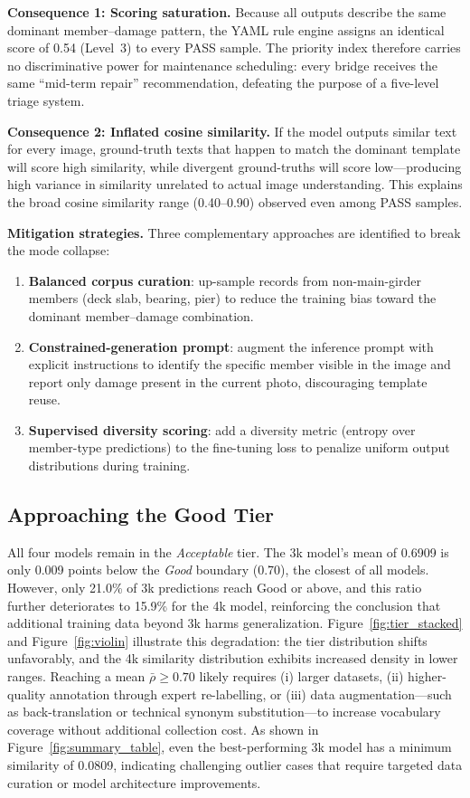 \documentclass[twocolumn]{article}
\begin{document}
\textbf{Consequence 1: Scoring saturation.}
Because all outputs describe the same dominant member--damage pattern,
the YAML rule engine assigns an identical score of 0.54 (Level~3)
to every PASS sample.
The priority index therefore carries no discriminative power for maintenance
scheduling: every bridge receives the same ``mid-term repair'' recommendation,
defeating the purpose of a five-level triage system.

\textbf{Consequence 2: Inflated cosine similarity.}
If the model outputs similar text for every image, ground-truth texts that
happen to match the dominant template will score high similarity, while
divergent ground-truths will score low---producing high variance in similarity
unrelated to actual image understanding.
This explains the broad cosine similarity range (0.40--0.90) observed
even among PASS samples.

\textbf{Mitigation strategies.}
Three complementary approaches are identified to break the mode collapse:
\begin{enumerate}[leftmargin=*,itemsep=2pt]
  \item \textbf{Balanced corpus curation}: up-sample records from non-main-girder
        members (deck slab, bearing, pier) to reduce the training bias toward
        the dominant member--damage combination.
  \item \textbf{Constrained-generation prompt}: augment the inference prompt
        with explicit instructions to identify the specific member visible in
        the image and report only damage present in the current photo,
        discouraging template reuse.
  \item \textbf{Supervised diversity scoring}: add a diversity metric
        (entropy over member-type predictions) to the fine-tuning loss
        to penalize uniform output distributions during training.
\end{enumerate}

\subsection{Approaching the Good Tier}

All four models remain in the \textit{Acceptable} tier.
The 3k model's mean of 0.6909 is only 0.009 points below the \textit{Good}
boundary (0.70), the closest of all models.
However, only 21.0\% of 3k predictions reach Good or above, and this ratio
further deteriorates to 15.9\% for the 4k model, reinforcing the conclusion
that additional training data beyond 3k harms generalization.
Figure~\ref{fig:tier_stacked} and Figure~\ref{fig:violin} illustrate this
degradation: the tier distribution shifts unfavorably, and the 4k similarity
distribution exhibits increased density in lower ranges.
Reaching a mean $\bar{\rho}\geq 0.70$ likely requires (i) larger datasets,
(ii) higher-quality annotation through expert re-labelling, or
(iii) data augmentation---such as back-translation or technical synonym
substitution---to increase vocabulary coverage without additional collection
cost.
As shown in Figure~\ref{fig:summary_table}, even the best-performing 3k model
has a minimum similarity of 0.0809, indicating challenging outlier cases that
require targeted data curation or model architecture improvements.
\end{document}
